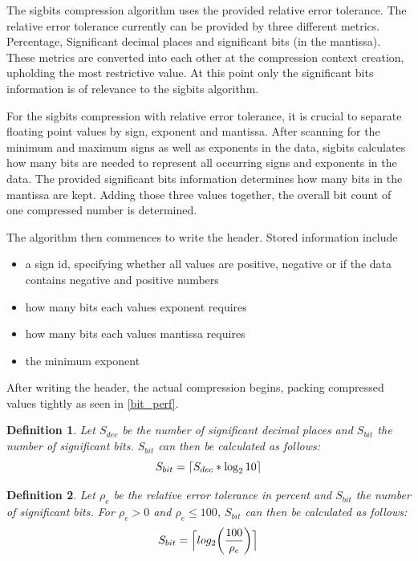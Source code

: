 \documentclass[
	12pt,
	a4paper,
	BCOR10mm,
	DIV14,
	headsepline,
]{scrreprt}
\newtheorem{definition}{Definition}
\DeclarePairedDelimiter{\ceil}{\lceil}{\rceil}
\begin{document}
\bigskip

The sigbits compression algorithm uses the provided relative error tolerance.
The relative error tolerance currently can be provided by three different
metrics. Percentage, Significant decimal places and significant bits (in the
mantissa). These metrics are converted into each other at the compression
context creation, upholding the most restrictive value. At this point only the
significant bits information is of relevance to the sigbits algorithm. \par
For the sigbits compression with relative error tolerance, it is crucial to
separate floating point values by sign, exponent and mantissa. After scanning
for the minimum and maximum signs as well as exponents in the data, sigbits calculates
how many bits are needed to represent all occurring signs and exponents in the
data. The provided significant bits information determines how many bits in the
mantissa are kept. Adding those three values together, the overall bit count of
one compressed number is determined.\par
The algorithm then commences to write the header. Stored information include

\begin{itemize}
	\item a sign id, specifying whether all values are positive, negative or if the data
			contains negative and positive numbers
	\item how many bits each values exponent requires
	\item how many bits each values mantissa requires
	\item the minimum exponent
\end{itemize}

After writing the header, the actual compression begins, packing compressed
values tightly as seen in \cref{bit_perf}.

\clearpage

\begin{definition} \label{D:sigbits_sdec}
	Let $S_{dec}$ be the number of significant decimal places and $S_{bit}$
	the number of significant bits. $S_{bit}$ can then be calculated as follows:
	\[
		S_{bit}=\ceil{S_{dec} * \log_{2}{10}}
	\]
\end{definition}

\bigskip

\begin{definition} \label{D:sigbits_rtol}
	Let $\rho_{e}$ be the relative error tolerance in percent and $S_{bit}$
	the number of significant bits. For $\rho_{e} > 0$ and $\rho_{e} \le 100$,
	$S_{bit}$ can then be calculated as follows:
	\[
		S_{bit}=\ceil[\Big]{
			log_2{
				\left(
					\frac{100}{\rho_{e}}
				\right)
			}
		}
	\]
\end{definition}
\end{document}

